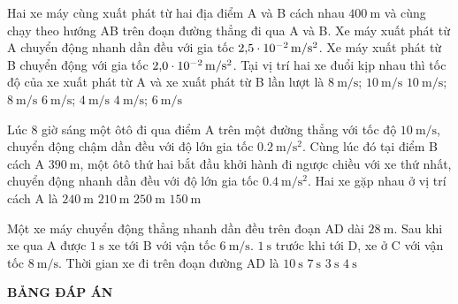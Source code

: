 \begin{ex}
	Hai xe máy cùng xuất phát từ hai địa điểm A và B cách nhau $\SI{400}{\meter}$ và cùng chạy theo hướng AB trên đoạn đường thẳng đi qua A và B. Xe máy xuất phát từ A chuyển động nhanh dần đều với gia tốc $\SI{2.5E-2}{\meter/\second^2}$. Xe máy xuất phát từ B chuyển động với gia tốc $\SI{2.0E-2}{\meter/\second^2}$. Tại vị trí hai xe đuổi kịp nhau thì tốc độ của xe xuất phát từ A và xe xuất phát từ B lần lượt là	
	\choice
	{$\SI{8}{\meter/\second}$; $\SI{10}{\meter/\second}$}
	{\True $\SI{10}{\meter/\second}$; $\SI{8}{\meter/\second}$}
	{$\SI{6}{\meter/\second}$; $\SI{4}{\meter/\second}$}
	{$\SI{4}{\meter/\second}$; $\SI{6}{\meter/\second}$}
	\loigiai{}
\end{ex}
\begin{ex}
	Lúc 8 giờ sáng một ôtô đi qua điểm A trên một đường thẳng với tốc độ $\SI{10}{\meter/\second}$, chuyển động chậm dần đều với độ lớn gia tốc $\SI{0.2}{\meter/\second^2}$. Cùng lúc đó tại điểm B cách A $\SI{390}{\meter}$, một ôtô thứ hai bắt đầu khởi hành đi ngược chiều với xe thứ nhất, chuyển động nhanh dần đều với độ lớn gia tốc $\SI{0.4}{\meter/\second^2}$. Hai xe gặp nhau ở vị trí cách A là 
	\choice
	{$\SI{240}{\meter}$}
	{\True $\SI{210}{\meter}$}
	{$\SI{250}{\meter}$}
	{$\SI{150}{\meter}$}
	\loigiai{}
\end{ex}
\begin{ex}
	Một xe máy chuyển động thẳng nhanh dần đều trên đoạn AD dài $\SI{28}{\meter}$. Sau khi xe qua A được $\SI{1}{\second}$ xe tới B với vận tốc $\SI{6}{\meter/\second}$. $\SI{1}{\second}$ trước khi tới D, xe ở C với vận tốc $\SI{8}{\meter/\second}$. Thời gian xe đi trên đoạn đường AD là
	\choice
	{$\SI{10}{\second}$}
	{$\SI{7}{\second}$}
	{$\SI{3}{\second}$}
	{\True $\SI{4}{\second}$}
	\loigiai{
	}
\end{ex}
\newpage
\begin{center}
	\textbf{BẢNG ĐÁP ÁN}
\end{center}
